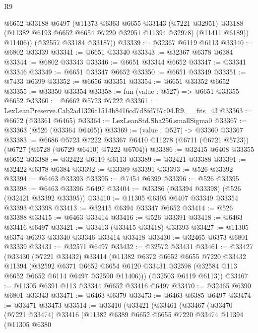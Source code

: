 \begin{lexlean}{R9}
\begin{coremodule}
          @6652
          @33188
          @6497
          (@11373
            @6363
            @6655
            @33143
            (@7221 @32951)
            @33188
            (@11382 @6193 @6652 @6654 @7220 @32951 @11394 @32978)
            (@11411 @6189))
          @11406))
      (@32557 @33184 @33187))
@33339 := @32367 @6119 @6113
@33340 := @6802 @33339
@33341 := @6651 @33340
@33343 := @32367 @6378 @6384
@33344 := @6802 @33343
@33346 := @6651 @33344 @6652
@33347 := @33341 @33346
@33349 := @6651 @33347 @6652
@33350 := @6651 @33349
@33351 := @7433 @6399
@33352 := @6656 @33351
@33354 := @6651 @33352 @6652
@33355 := @33350 @33354
@33358 := fun (value : @527) => @6651 @33355 @6652
@33360 := @6662 @5723 @7222
@33361 := LexLeanPreserve.Cab2ad1326c1514b8416cd7d8fd767c04.R9.__fits_43
@33363 := @6672 (@33361 @6465)
@33364 := LexLeanStd.Sha256.smallSigma0
@33367 := @33363 (@526 (@33364 @6465))
@33369 := (value : @527) -> @33360 @33367
@33383 := @6686
    @5723
    @7222
    @33367
    @6410
    @11278
    (@6711 (@6721 @5723))
    (@6727 (@6728 (@6729 @6410) @7222 @6704))
@33386 := @32415 @6408 @33355 @6652
@33388 := @32422 @6119 @6113
@33389 := @32421 @33388
@33391 := @32422 @6378 @6384
@33392 := @33389 @33391
@33393 := @526 @33392
@33394 := @6463 @33393
@33395 := @7454 @6399
@33396 := @526 @33395
@33398 := @6463 @33396 @6497
@33404 := @33386 (@33394 @33398) (@526 (@32421 @33392 @33395))
@33410 := @11305 @6395 @6407 @33349 @33354 @33393 @33398
@33413 := @32415 @6394 @33347 @6652
@33414 := @526 @33388
@33415 := @6463 @33414
@33416 := @526 @33391
@33418 := @6463 @33416 @6497
@33421 := @33413 (@33415 @33418) @33393
@33427 := @11305 @6374 @6393 @33340 @33346 @33414 @33418
@33430 := @32465 @6373 @6801 @33339
@33431 := @32571 @6497
@33432 := @32572 @33431
@33461 := @33427
    (@33430
      (@7221 @33432)
      @33414
      (@11382
        @6372
        @6652
        @6655
        @7220
        @33432
        @11394
        (@32592
          @6371
          @6652
          @6654
          @6120
          @33431
          @32598
          (@32584 @113 @6652 @6652 @6114 @6497 @32590 @11406)))
      (@32503 @6119 @6113))
@33467 := @11305 @6391 @113 @33344 @6652 @33416 @6497
@33470 := @32465 @6390 @6801 @33343
@33471 := @6463 @6379
@33473 := @6463 @6385 @6497
@33474 := @33471 @33473
@33514 := @33410
    (@33421
      (@33461
        (@33467
          (@33470
            (@7221 @33474)
            @33416
            (@11382
              @6389
              @6652
              @6655
              @7220
              @33474
              @11394
              (@11305
                @6380

\end{coremodule}
\end{lexlean}
